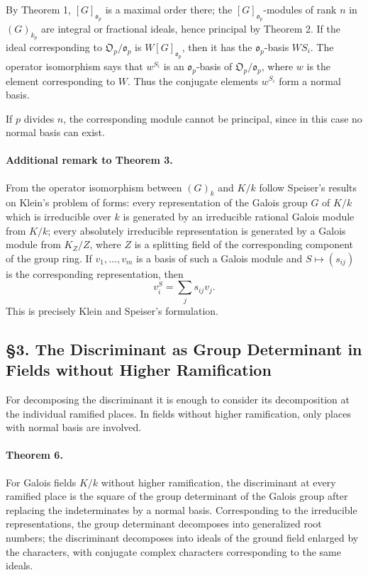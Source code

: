 \documentclass[11pt]{article}
\providecommand{\frako}{\mathfrak o}
\providecommand{\frako}{\mathfrak o}
\providecommand{\frakO}{\mathfrak O}
\begin{document}
By Theorem 1, \([G]_{\frako_p}\) is a maximal order there; the \([G]_{\frako_p}\)-modules of rank \(n\) in \((G)_{k_p}\) are integral or fractional ideals, hence principal by Theorem 2. If the ideal corresponding to \(\frakO_p/\frako_p\) is \(W[G]_{\frako_p}\), then it has the \(\frako_p\)-basis \(WS_i\). The operator isomorphism says that \(w^{S_i}\) is an \(\frako_p\)-basis of \(\frakO_p/\frako_p\), where \(w\) is the element corresponding to \(W\). Thus the conjugate elements \(w^{S_i}\) form a normal basis.

If \(p\) divides \(n\), the corresponding module cannot be principal, since in this case no normal basis can exist.

\paragraph{Additional remark to Theorem 3.}
From the operator isomorphism between \((G)_k\) and \(K/k\) follow Speiser's results on Klein's problem of forms: every representation of the Galois group \(G\) of \(K/k\) which is irreducible over \(k\) is generated by an irreducible rational Galois module from \(K/k\); every absolutely irreducible representation is generated by a Galois module from \(K_Z/Z\), where \(Z\) is a splitting field of the corresponding component of the group ring. If \(v_1,\ldots,v_m\) is a basis of such a Galois module and \(S\mapsto (s_{ij})\) is the corresponding representation, then
\[
        v_i^S=\sum_j s_{ij}v_j.
\]
This is precisely Klein and Speiser's formulation.

\subsection*{§3. The Discriminant as Group Determinant in Fields without Higher Ramification}

For decomposing the discriminant it is enough to consider its decomposition at the individual ramified places. In fields without higher ramification, only places with normal basis are involved.

\paragraph{Theorem 6.}
For Galois fields \(K/k\) without higher ramification, the discriminant at every ramified place is the square of the group determinant of the Galois group after replacing the indeterminates by a normal basis. Corresponding to the irreducible representations, the group determinant decomposes into generalized root numbers; the discriminant decomposes into ideals of the ground field enlarged by the characters, with conjugate complex characters corresponding to the same ideals.
\end{document}
